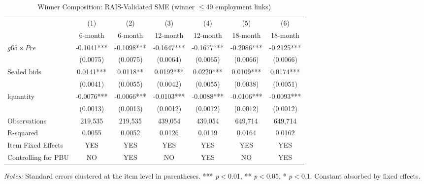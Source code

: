\begin{table}[htbp]
\centering
\caption{Winner Composition: RAIS-Validated SME (winner $\leq$49 employment links)}
\label{tab:winner_rais}
\begin{adjustbox}{max width=\textwidth}
\begin{threeparttable}
\small
\begin{tabular}{lcccccc}
\toprule
 & (1) & (2) & (3) & (4) & (5) & (6) \\
 & 6-month & 6-month & 12-month & 12-month & 18-month & 18-month \\
\midrule
$g65 \times Pre$ & -0.1041*** & -0.1098*** & -0.1647*** & -0.1677*** & -0.2086*** & -0.2125*** \\
 & (0.0075) & (0.0075) & (0.0064) & (0.0065) & (0.0066) & (0.0066) \\
Sealed bids & 0.0141*** & 0.0118** & 0.0192*** & 0.0220*** & 0.0109*** & 0.0174*** \\
 & (0.0041) & (0.0055) & (0.0042) & (0.0055) & (0.0038) & (0.0051) \\
lquantity & -0.0076*** & -0.0066*** & -0.0103*** & -0.0088*** & -0.0106*** & -0.0093*** \\
 & (0.0013) & (0.0013) & (0.0012) & (0.0012) & (0.0012) & (0.0012) \\
\midrule
Observations & 219,535 & 219,535 & 439,054 & 439,054 & 649,714 & 649,714 \\
R-squared & 0.0055 & 0.0052 & 0.0126 & 0.0119 & 0.0164 & 0.0162 \\
Item Fixed Effects & YES & YES & YES & YES & YES & YES \\
Controlling for PBU & NO & YES & NO & YES & NO & YES \\
\bottomrule
\end{tabular}
\begin{tablenotes}
\small
\item \textit{Notes:} Standard errors clustered at the item level in parentheses.
*** \textit{p}$<$0.01, ** \textit{p}$<$0.05, * \textit{p}$<$0.1.
Constant absorbed by fixed effects.
\end{tablenotes}
\end{threeparttable}
\end{adjustbox}
\end{table}
